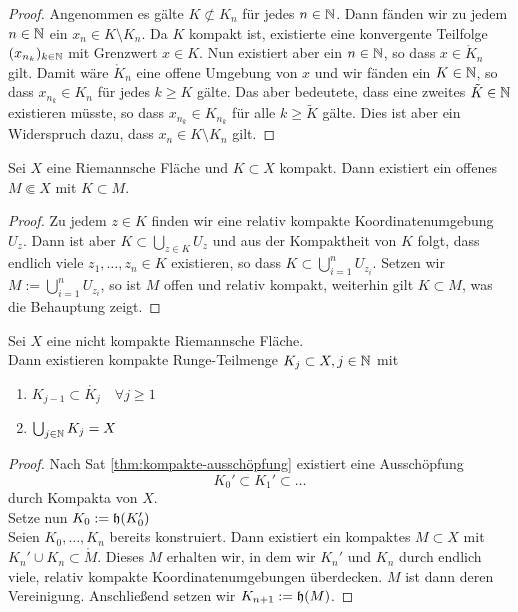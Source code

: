 \begin{proof}
  Angenommen es gälte $K \not \subset K_n$ für jedes $n \in \mathbb{N}$. Dann
  fänden wir zu jedem $n \in \mathbb{N}$ ein $x_n \in K\setminus K_n$. Da $K$
  kompakt ist, existierte eine konvergente Teilfolge $(x_{n_k})_{k\in
    \mathbb{N}}$ mit Grenzwert $x \in K$. Nun existiert aber ein $n \in \mathbb{N}$,
  so dass $x \in \mathring K_n$ gilt. Damit wäre $\mathring K_n$ eine offene
  Umgebung von $x$ und wir fänden ein $K \in \mathbb{N}$, so dass $x_{n_k} \in
  K_n$ für jedes $k\geq K$ gälte. Das aber bedeutete, dass eine
  zweites $\tilde K \in \mathbb{N}$ existieren müsste, so dass $x_{n_k} \in K_{n_k}$
  für alle $k \geq \tilde K$ gälte. Dies ist aber ein Widerspruch dazu,
  dass $x_n \in K \setminus K_n$ gilt.
\end{proof}


\begin{lemma}
  \label{lemma:komp-enthalten}
  Sei $X$ eine Riemannsche Fläche und $K \subset X$ kompakt. Dann
  existiert ein offenes $M \Subset X$ mit $K \subset M$.
\end{lemma}

\begin{proof}
  Zu jedem $z \in K$ finden wir eine relativ kompakte
  Koordinatenumgebung $U_z$. Dann ist aber $K \subset \bigcup_{z \in
    K}U_z$ und aus der Kompaktheit von $K$ folgt, dass endlich viele
  $z_1, \dots, z_n \in K$ existieren, so dass $K \subset
  \bigcup_{i=1}^n U_{z_i}$. Setzen wir $M := \bigcup_{i=1}^n U_{z_i}$,
  so ist $M$ offen und relativ kompakt, weiterhin gilt $K \subset M$,
  was die Behauptung zeigt.
\end{proof}

\begin{cor}
  \label{cor:ausschöpfung-kompakt}
  Sei $X$ eine nicht kompakte Riemannsche Fläche. \\
  Dann existieren kompakte Runge-Teilmenge $K_j \subset X, j \in \mathbb{N}$ mit
  \begin{enumerate}
  \item $K_{j-1} \subset \mathring{K_j} \quad \forall j \geq 1$
  \item $\bigcup_{j\in \mathbb{N}} K_j = X$
  \end{enumerate}
\end{cor}

\begin{proof}
  Nach Sat \ref{thm:kompakte-ausschöpfung} existiert eine 
  Ausschöpfung
  \[
  K_0' \subset K_1' \subset \dots
  \]
  durch Kompakta von $X$. \\
  Setze nun $K_0 := \mathfrak{h}(K_0')$ \\
  Seien $K_0, \dots, K_n$ bereits konstruiert. Dann existiert ein
  kompaktes $M \subset X$ mit $K_n' \cup K_n \subset \mathring
  M$. Dieses $M$ erhalten wir, in dem wir $K_n'$ und $K_n$ durch
  endlich viele, relativ kompakte Koordinatenumgebungen
  überdecken. $M$ ist dann deren Vereinigung. Anschließend setzen wir
  $K_{n+1} := \mathfrak{h}(M)$.
\end{proof}

